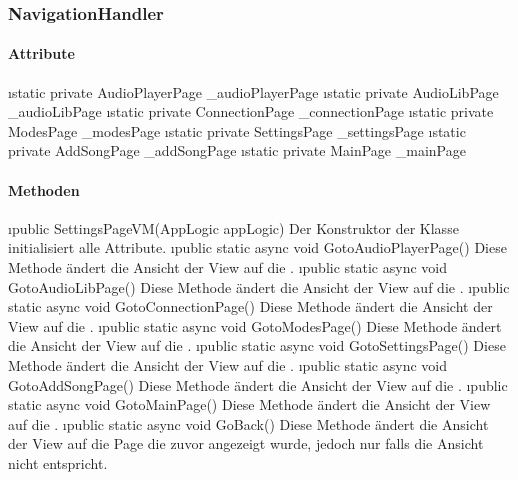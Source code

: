 \documentclass[../entwurf.tex]{subfiles}
\begin{document}
\subsubsection{NavigationHandler}
\paragraph{Attribute}
\begin{itemize}
	\i{static private AudioPlayerPage \_audioPlayerPage}
	\i{static private AudioLibPage \_audioLibPage}
	\i{static private ConnectionPage \_connectionPage}
	\i{static private ModesPage \_modesPage}
	\i{static private SettingsPage \_settingsPage}
	\i{static private AddSongPage \_addSongPage}
	\i{static private MainPage \_mainPage}
\end{itemize}
\paragraph{Methoden}
\begin{itemize}
	\i{public SettingsPageVM(AppLogic appLogic)} Der Konstruktor der Klasse initialisiert alle Attribute.
	\i{public static async void GotoAudioPlayerPage()} Diese Methode ändert die Ansicht der View auf die .
	\i{public static async void GotoAudioLibPage()} Diese Methode ändert die Ansicht der View auf die .
	\i{public static async void GotoConnectionPage()} Diese Methode ändert die Ansicht der View auf die .
	\i{public static async void GotoModesPage()} Diese Methode ändert die Ansicht der View auf die .
	\i{public static async void GotoSettingsPage()} Diese Methode ändert die Ansicht der View auf die .
	\i{public static async void GotoAddSongPage()} Diese Methode ändert die Ansicht der View auf die .
	\i{public static async void GotoMainPage()} Diese Methode ändert die Ansicht der View auf die .
	\i{public static async void GoBack()} Diese Methode ändert die Ansicht der View auf die Page die zuvor angezeigt wurde, jedoch nur falls die Ansicht nicht  entspricht.
\end{itemize}
\end{document}
